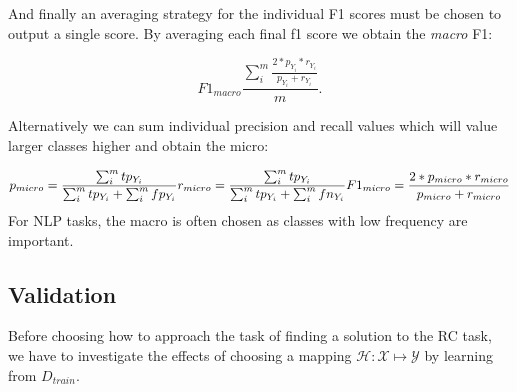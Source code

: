\begin{center}
\end{center}

And finally an averaging strategy for the individual F1 scores must be chosen to output a single score. By averaging each final f1 score we obtain the \emph{macro} F1: 

$$ 
F1_{macro} \frac{\sum_{i}^{m} \frac{2 * p_{Y_i} * r_{Y_i}}{p_{Y_i} + r_{Y_i}}}{m}. 
$$

Alternatively we can sum individual precision and recall values which will value larger classes higher and obtain the micro:

$$
p_{micro} = \frac{\sum_{i}^{m} tp_{Y_i} } {\sum_{i}^{m} tp_{Y_i}+\sum_{i}^{m} fp_{Y_i}} \\
r_{micro} = \frac{\sum_{i}^{m} tp_{Y_i} } {\sum_{i}^{m} tp_{Y_i}+\sum_{i}^{m} fn_{Y_i}} \\
F1_{micro} = \frac{2 * p_{micro} * r_{micro}}{p_{micro} + r_{micro}} \\
$$
For NLP tasks, the macro is often chosen as classes with low frequency are important. 

\subsection{Validation}

Before choosing how to approach the task of finding a solution to the RC task, we have to investigate the effects of choosing a mapping $\mathcal{H}:\mathcal{X}\mapsto\mathcal{Y}$ by learning from $D_{train}$. 





